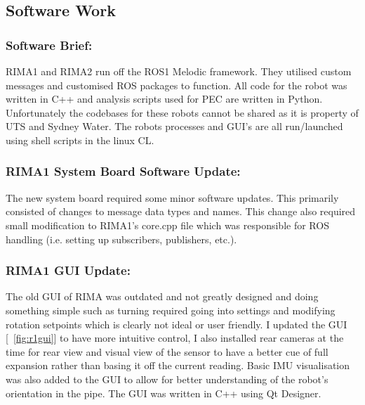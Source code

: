 \newpage
\subsection{Software Work}

\subsubsection{Software Brief: }
RIMA1 and RIMA2 run off the ROS1 Melodic framework. They utilised custom messages and customised ROS packages to function. All code for the robot was written in C++ and analysis scripts used for PEC are written
in Python. Unfortunately the codebases for these robots cannot be shared as it is property of UTS and Sydney Water. The robots processes and GUI's are all run/launched using shell scripts in the linux CL.

\vspace{\baselineskip}
\subsubsection{RIMA1 System Board Software Update: }
The new system board required some minor software updates. This primarily consisted of changes to message data types and names. This change also required small modification to RIMA1's core.cpp file which was responsible 
for ROS handling (i.e. setting up subscribers, publishers, etc.). 

\vspace{\baselineskip}
\subsubsection{RIMA1 GUI Update: }
The old GUI of RIMA was outdated and not greatly designed and doing something simple such as turning required going into settings and modifying rotation setpoints which is clearly not ideal or user friendly. I updated
the GUI [~\ref{fig:r1gui}] to have more intuitive control, I also installed rear cameras at the time for rear view and visual view of the sensor to have a better cue of full expansion rather than basing it off the current reading. Basic 
IMU visualisation was also added to the GUI to allow for better understanding of the robot's orientation in the pipe. The GUI was written in C++ using Qt Designer.


